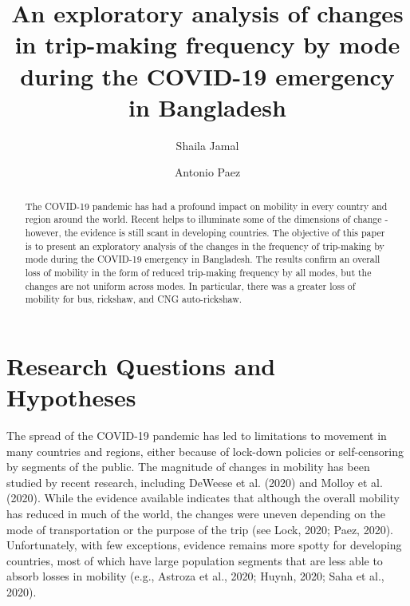 \documentclass[]{elsarticle} %
\begin{document}
\begin{frontmatter}

  \title{An exploratory analysis of changes in trip-making frequency by mode
during the COVID-19 emergency in Bangladesh}
    \author[McMaster University]{Shaila Jamal}
    \author[McMaster University]{Antonio Paez}
      \address[McMaster University]{School of Earth, Environment and Society, McMaster University, Hamilton,
ON, L8S 4K1, Canada}
  
  \begin{abstract}
  The COVID-19 pandemic has had a profound impact on mobility in every
  country and region around the world. Recent helps to illuminate some of
  the dimensions of change - however, the evidence is still scant in
  developing countries. The objective of this paper is to present an
  exploratory analysis of the changes in the frequency of trip-making by
  mode during the COVID-19 emergency in Bangladesh. The results confirm an
  overall loss of mobility in the form of reduced trip-making frequency by
  all modes, but the changes are not uniform across modes. In particular,
  there was a greater loss of mobility for bus, rickshaw, and CNG
  auto-rickshaw.
  \end{abstract}
  
 \end{frontmatter}

\hypertarget{research-questions-and-hypotheses}{%
\section{Research Questions and
Hypotheses}\label{research-questions-and-hypotheses}}

The spread of the COVID-19 pandemic has led to limitations to movement
in many countries and regions, either because of lock-down policies or
self-censoring by segments of the public. The magnitude of changes in
mobility has been studied by recent research, including DeWeese et al.
(2020) and Molloy et al. (2020). While the evidence available indicates
that although the overall mobility has reduced in much of the world, the
changes were uneven depending on the mode of transportation or the
purpose of the trip (see Lock, 2020; Paez, 2020). Unfortunately, with
few exceptions, evidence remains more spotty for developing countries,
most of which have large population segments that are less able to
absorb losses in mobility (e.g., Astroza et al., 2020; Huynh, 2020; Saha
et al., 2020).
\end{document}
